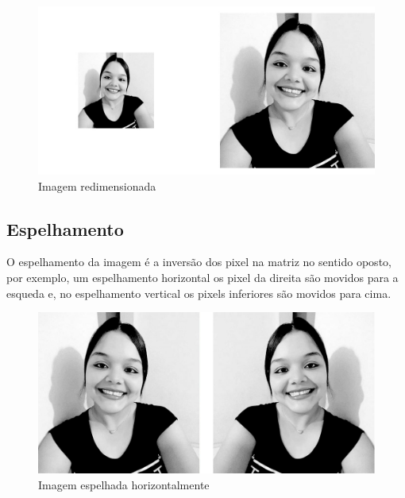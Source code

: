 		\begin{figure}[!htb]
			\centering
			\includegraphics[width=\textwidth]{img/05-redimen.jpg}
			\caption{Imagem redimensionada}
		\end{figure}
		
		\lstset{language=Python}
		{\tiny }
		
	\subsection{Espelhamento}
		O espelhamento da imagem é a inversão dos pixel na matriz no sentido oposto, por exemplo, um espelhamento horizontal os pixel da direita são movidos para a esqueda e, no espelhamento vertical os pixels inferiores são movidos para cima. 
		
		\begin{figure}[!htb]
			\centering
			\includegraphics[width=\textwidth]{img/06-espelho.jpg}
			\caption{Imagem espelhada horizontalmente}
		\end{figure}
		
		\lstset{language=c++}
		{\tiny }
		
